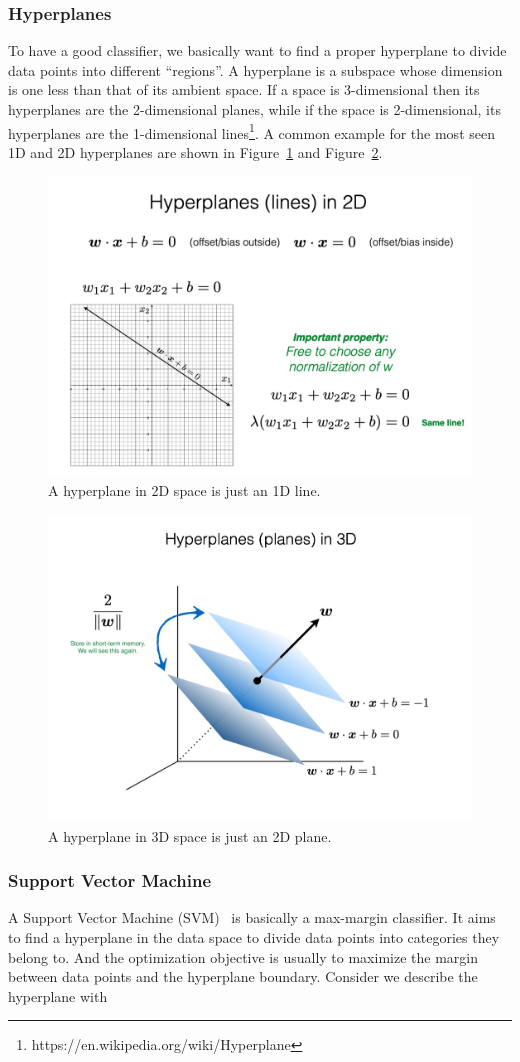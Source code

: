 \documentclass[11pt]{article}
\begin{document}
\subsubsection{Hyperplanes}
To have a good classifier, we basically want to find a proper hyperplane to divide data points into different ``regions''. A hyperplane is a subspace whose dimension is one less than that of its ambient space. If a space is 3-dimensional then its hyperplanes are the 2-dimensional planes, while if the space is 2-dimensional, its hyperplanes are the 1-dimensional lines\footnote{https://en.wikipedia.org/wiki/Hyperplane}. A common example for the most seen 1D and 2D hyperplanes are shown in Figure~\ref{fig:2d_plane}
 and Figure~\ref{fig:3d_plane}.
\begin{figure}[H]
    \centering
    \includegraphics[width=.6\linewidth]{lecture_11_B/figs/2d_plane.png}
    \caption{A hyperplane in 2D space is just an 1D line.}
    \label{fig:2d_plane}
\end{figure}

\begin{figure}[H]
    \centering
    \includegraphics[width=.6\linewidth]{lecture_11_B/figs/3d_plane.png}
    \caption{A hyperplane in 3D space is just an 2D plane.}
    \label{fig:3d_plane}
\end{figure}

\subsubsection{Support Vector Machine}
A Support Vector Machine (SVM)~\cite{noble2006support} is basically a max-margin classifier. It aims to find a hyperplane in the data space to divide data points into categories they belong to. And the optimization objective is usually to maximize the margin between data points and the hyperplane boundary. Consider we describe the hyperplane with 
\end{document}
